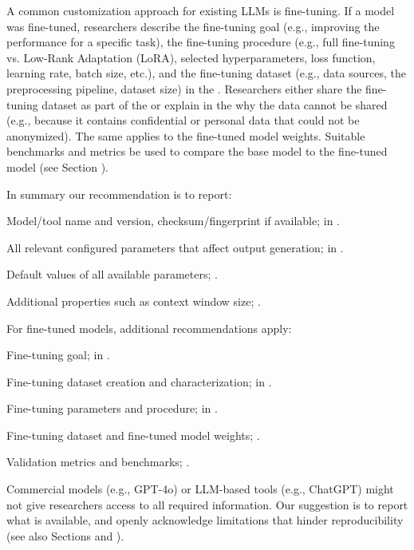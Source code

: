 A common customization approach for existing LLMs is fine-tuning. If a model was fine-tuned, researchers \must describe the fine-tuning goal (e.g., improving the performance for a specific task), the fine-tuning procedure (e.g., full fine-tuning vs. Low-Rank Adaptation (LoRA), selected hyperparameters, loss function, learning rate, batch size, etc.), and the fine-tuning dataset (e.g., data sources, the preprocessing pipeline, dataset size) in the \paper.
Researchers \should either share the fine-tuning dataset as part of the \supplementarymaterial or explain in the \paper why the data cannot be shared (e.g., because it contains confidential or personal data that could not be anonymized).
The same applies to the fine-tuned model weights.
Suitable benchmarks and metrics \should be used to compare the base model to the fine-tuned model (see Section \benchmarksmetrics).

In summary our recommendation is to report:
\begin{enumerate*}[label=\textbf{(\arabic*)}]
\item Model/tool name and version, checksum/fingerprint if available; \must in \paper.
\item All relevant configured parameters that affect output generation; \must in \paper.
\item Default values of all available parameters; \should.
\item Additional properties such as context window size; \may.
\end{enumerate*}

For fine-tuned models, additional recommendations apply:
\begin{enumerate*}[label=\textbf{(\arabic*)}]
\item Fine-tuning goal; \must in \paper.
\item Fine-tuning dataset creation and characterization; \must in \paper.
\item Fine-tuning parameters and procedure; \must in \paper.
\item Fine-tuning dataset and fine-tuned model weights; \should.
\item Validation metrics and benchmarks; \should.
\end{enumerate*}

Commercial models (e.g., GPT-4o) or LLM-based tools (e.g., ChatGPT) might not give researchers access to all required information.
Our suggestion is to report what is available, and openly acknowledge limitations that hinder reproducibility (see also Sections \prompts and \limitationsmitigations).


